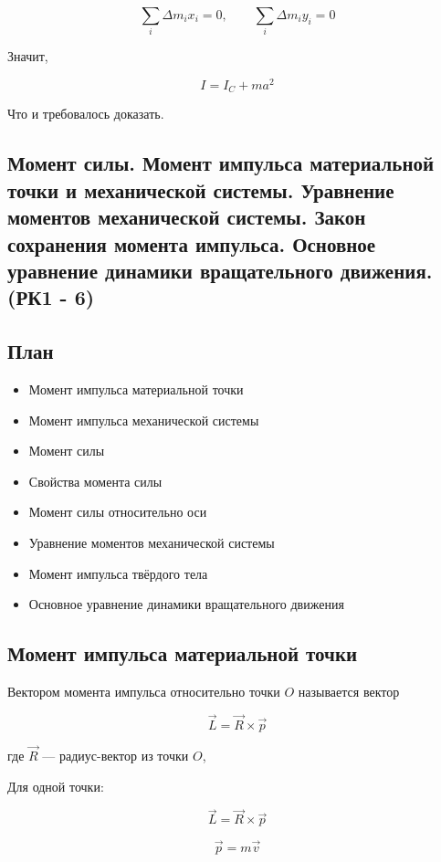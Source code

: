 \documentclass[a4paper,12pt]{article}
\begin{document}
\[
\sum_i \Delta m_i x_i = 0,\qquad \sum_i \Delta m_i y_i = 0
\]

Значит,

\[
I = I_C + ma^2
\]

Что и требовалось доказать.

\subsection{Момент силы. Момент импульса материальной точки и механической системы. Уравнение моментов механической системы. Закон сохранения момента импульса. Основное уравнение динамики вращательного движения. (РК1 - 6)}

\subsection*{План}
\begin{itemize}
\item Момент импульса материальной точки
\item Момент импульса механической системы
\item Момент силы
\item Свойства момента силы
\item Момент силы относительно оси
\item Уравнение моментов механической системы
\item Момент импульса твёрдого тела
\item Основное уравнение динамики вращательного движения
\end{itemize}

\vspace{0.8em}

\subsection*{Момент импульса материальной точки}

\begin{definitionbox}
Вектором момента импульса относительно точки $O$ называется вектор

\[
\vec L = \vec R \times \vec p
\]

где $\vec R$ — радиус-вектор из точки $O$,
\end{definitionbox}

Для одной точки:

\[
\vec L = \vec R \times \vec p
\]

\[
\vec p = m \vec v
\]
\end{document}
